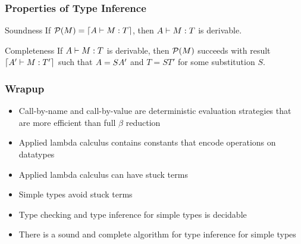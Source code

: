 \documentclass[pdftex,aspectratio=169]{beamer}
\begin{document}
\begin{frame}
  \frametitle{Properties of Type Inference}
  \begin{block}{Soundness}
    If $\mathcal{P} (M) = \lceil A \vdash M: T\rceil$, then $A \vdash M: T$ is derivable.
  \end{block}
  \begin{block}{Completeness}
    If $A \vdash M : T$ is derivable, then $\mathcal{P} (M)$ succeeds with result $\lceil A' \vdash M: T'\rceil$ such that $A = SA'$ and $T = S T'$ for some substitution $S$. 
  \end{block}
\end{frame}

\begin{frame}
  \frametitle{Wrapup}
  \begin{itemize}
  \item Call-by-name and call-by-value are deterministic evaluation strategies that are more efficient than full $\beta$ reduction
  \item Applied lambda calculus contains constants that encode operations on datatypes
  \item Applied lambda calculus can have stuck terms
  \item Simple types avoid stuck terms
  \item Type checking and type inference for simple types is decidable
  \item There is a sound and complete algorithm for type inference for simple types
  \end{itemize}
\end{frame}
\end{document}
